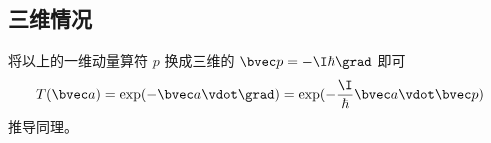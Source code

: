 \subsection{三维情况}
将以上的一维动量算符 $p$ 换成三维的 $\bvec p = -\I \hbar \grad$ 即可
\begin{equation}
T(\bvec a) = \exp(-\bvec a \vdot \grad) = \exp(-\frac{\I}{\hbar} \bvec a \vdot \bvec p)
\end{equation}
推导同理。









